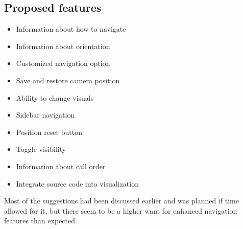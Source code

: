 \subsection{Proposed features}
\begin{itemize}
    \item Information about how to navigate
    \item Information about orientation
    \item Customized navigation option
    \item Save and restore camera position
    \item Ability to change visuals
    \item Sidebar navigation
    \item Position reset button
    \item Toggle visibility
    \item Information about call order
    \item Integrate source code into visualization
\end{itemize}

Most of the suggestions had been discussed earlier and was planned if time allowed for it, but there seem to be a higher want for enhanced navigation features than expected. 